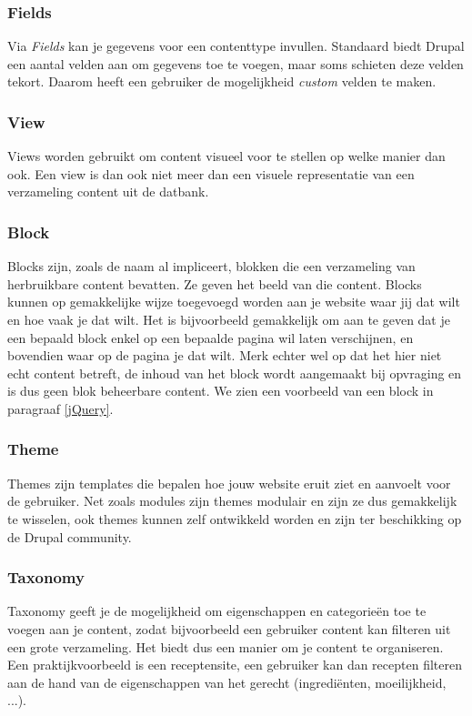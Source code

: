 \subsubsection{Fields}
Via \textit{Fields} kan je gegevens voor een contenttype invullen. Standaard biedt Drupal een aantal velden aan om gegevens toe te voegen, maar soms schieten deze velden tekort. Daarom heeft een gebruiker de mogelijkheid \textit{custom} velden te maken.

\subsubsection{View}
Views worden gebruikt om content visueel voor te stellen op welke manier dan ook. Een view is dan ook niet meer dan een visuele representatie van een verzameling content uit de datbank.

\subsubsection{Block}
Blocks zijn, zoals de naam al impliceert, blokken die een verzameling van herbruikbare content bevatten. Ze geven het beeld van die content. Blocks kunnen op gemakkelijke wijze toegevoegd worden aan je website waar jij dat wilt en hoe vaak je dat wilt. Het is bijvoorbeeld gemakkelijk om aan te geven dat je een bepaald block enkel op een bepaalde pagina wil laten verschijnen, en bovendien waar op de pagina je dat wilt. Merk echter wel op dat het hier niet echt content betreft, de inhoud van het block wordt aangemaakt bij opvraging en is dus geen blok beheerbare content. We zien een voorbeeld van een block in paragraaf \ref{jQuery}.

\subsubsection{Theme}
Themes zijn templates die bepalen hoe jouw website eruit ziet en aanvoelt voor de gebruiker. Net zoals modules zijn themes modulair en zijn ze dus gemakkelijk te wisselen, ook themes kunnen zelf ontwikkeld worden en zijn ter beschikking op de Drupal community.

\subsubsection{Taxonomy}
Taxonomy geeft je de mogelijkheid om eigenschappen en categorie\"{e}n toe te voegen aan je content, zodat bijvoorbeeld een gebruiker content kan filteren uit een grote verzameling. Het biedt dus een manier om je content te organiseren. Een praktijkvoorbeeld is een receptensite, een gebruiker kan dan recepten filteren aan de hand van de eigenschappen van het gerecht (ingredi\"{e}nten, moeilijkheid, ...).

